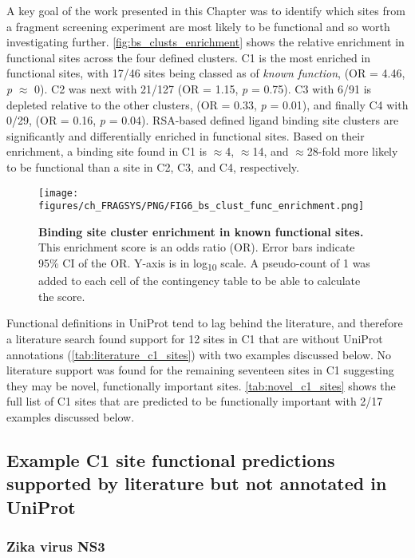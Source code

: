 {A key goal of the work presented in this Chapter was to identify which sites from a fragment screening experiment are most likely to be functional and so worth investigating further. \autoref{fig:bs_clusts_enrichment} shows the relative enrichment in functional sites across the four defined clusters. C1 is the most enriched in functional sites, with 17/46 sites being classed as of \textit{known function}, (OR = 4.46, \textit{p} $\approx$ 0). C2 was next with 21/127 (OR = 1.15, \textit{p} = 0.75). C3 with 6/91 is depleted relative to the other clusters, (OR = 0.33, \textit{p} = 0.01), and finally C4 with 0/29, (OR = 0.16, \textit{p} = 0.04). RSA-based defined ligand binding site clusters are significantly and differentially enriched in functional sites. Based on their enrichment, a binding site found in C1 is $\approx$4, $\approx$14, and $\approx$28-fold more likely to be functional than a site in C2, C3, and C4, respectively.

\begin{figure}[htb!]
    \centering
    \texttt{[image: figures/ch\_FRAGSYS/PNG/FIG6\_bs\_clust\_func\_enrichment.png]}
    \caption[Binding site cluster enrichment in known functional sites]{\textbf{Binding site cluster enrichment in known functional sites.} This enrichment score is an odds ratio (OR). Error bars indicate 95\% CI of the OR. Y-axis is in log\textsubscript{10} scale. A pseudo-count of 1 was added to each cell of the contingency table to be able to calculate the score.}
    \label{fig:bs_clusts_enrichment}
\end{figure}

Functional definitions in UniProt tend to lag behind the literature, and therefore a literature search found support for 12 sites in C1 that are without UniProt annotations (\autoref{tab:literature_c1_sites}) with two examples discussed below. No literature support was found for the remaining seventeen sites in C1 suggesting they may be novel, functionally important sites. \autoref{tab:novel_c1_sites} shows the full list of C1 sites that are predicted to be functionally important with 2/17 examples discussed below.

\subsection{Example C1 site functional predictions supported by literature but not annotated in UniProt}

\subsubsection{Zika virus NS3}

}
